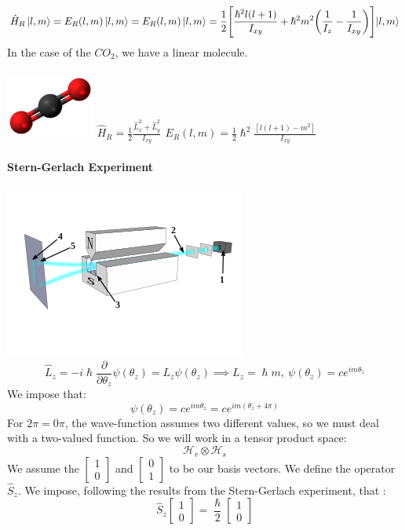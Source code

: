 \documentclass{article}
\begin{document}
$$\hat{H}_R \ket{l,m} = E_R(l,m) \ket{l,m} = E_R (l,m) \ket{l,m} = \frac{1}{2} \Biggl[ \frac{\hslash^2l(l+1)}{I_{xy}} + \hslash^2m^2 \biggl( \frac{1}{I_z} - \frac{1}{I_{xy}} \biggl) \Biggl] \ket{l,m}$$
In the case of the $CO_2$, we have a linear molecule.
\\ \\ 
\includegraphics[scale = 1]{co2.png} $\hat{H}_R = \frac{1}{2} \frac{\hat{L}_x^2+ \hat{L}_y^2}{I_{xy}} \, \ E_R(l,m) = \frac{1}{2} \hslash^2 \frac{[l(l+1) - m^2]}{I_{xy}} \ $ \\ \\ 
\textbf{Stern-Gerlach Experiment} \\ \\ 
\includegraphics[scale = 0.7]{sge.png} \\ 
$$\hat{L}_z = -i \hslash \frac{\partial}{\partial \theta_z} \psi(\theta_z) = L_z \psi(\theta_z) \implies L_z = \hslash m, \ \psi(\theta_z) = c e^{im\theta_z}$$
We impose that:
$$\psi(\theta_z) = c e^{im\theta_z} = c e^{im(\theta_z+4\pi)}$$
For $2\pi = 0\pi$, the wave-function assumes two different values, so we must deal with a two-valued function.
So we will work in a tensor product space:
$$\mathcal{H}_r \otimes \mathcal{H}_s$$
We assume the $\begin{bmatrix} 1 \\ 0 \end{bmatrix}$ and $\begin{bmatrix} 0 \\ 1 \end{bmatrix}$ to be our basis vectors.
We define the operator $\hat{S}_z$.
We impose, following the results from the Stern-Gerlach experiment, that : 
$$\hat{S}_z \begin{bmatrix} 1 \\ 0 \end{bmatrix} = \frac{\hslash}{2} \begin{bmatrix} 1 \\ 0 \end{bmatrix}$$
\end{document}
